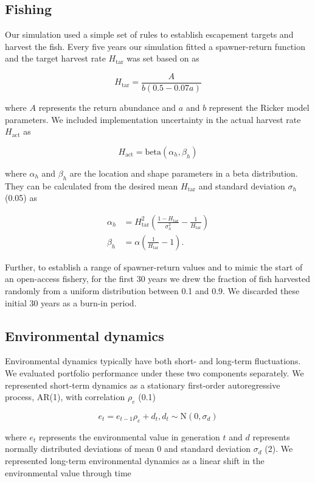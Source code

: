 \subsection{Fishing}

Our simulation used a simple set of rules to establish escapement targets and harvest the fish. Every five years our simulation fitted a spawner-return function and the target harvest rate $H_{\mathrm{tar}}$ was set based on \citet{hilborn1992} as

\[H_{\mathrm{tar}} = \frac{A}{b (0.5 - 0.07a)} \label{eq:esc}\]

where $A$ represents the return abundance and $a$ and $b$ represent the Ricker model parameters. We included implementation uncertainty in the actual harvest rate $H_{\mathrm{act}}$ as

\[H_{\mathrm{act}} = \mathrm{beta}(\alpha_h, \beta_h)\]

where $\alpha_h$ and $\beta_h$ are the location and shape parameters in a beta distribution. They can be calculated from the desired mean $H_{\mathrm{tar}}$ and standard deviation $\sigma_h$ (0.05) as \citep[p.~97]{morgan1990}

\[\begin{aligned} \alpha_h &= H_{\mathrm{tar}}^2 \left( \frac{1 -
H_{\mathrm{tar}}}{\sigma_h^2} - \frac{1}{H_{\mathrm{tar}}} \right)\\ \beta_h
&= \alpha \left({\frac{1}{H_{\mathrm{tar}}} - 1}\right).\end{aligned}\]

Further, to establish a range of spawner-return values and to mimic the start of an open-access fishery, for the first 30 years we drew the fraction of fish harvested randomly from a uniform distribution between 0.1 and 0.9. We discarded these initial 30 years as a burn-in period.

\subsection{Environmental dynamics}

Environmental dynamics typically have both short- and long-term fluctuations. We evaluated portfolio performance under these two components separately. We represented short-term dynamics as a stationary first-order autoregressive process, AR(1), with correlation $\rho_e$ (0.1)

\[e_t = e_{t-1} \rho_e + d_t, d_t \sim \mathrm{N}(0, \sigma_d)\]

where $e_t$ represents the environmental value in generation $t$ and $d$ represents normally distributed deviations of mean 0 and standard deviation $\sigma_d$ (2). We represented long-term environmental dynamics as a linear shift in the environmental value through time

